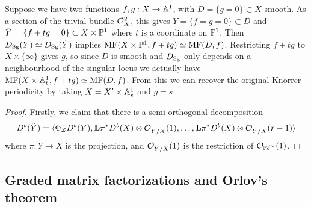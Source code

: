 \begin{example}{}{}
    Suppose we have two functions $f,g:X\to\A^1$, with $D=\{g=0\}\subset X$
    smooth. As a section of the trivial bundle $\O_X^2$, this gives
    $Y=\{f=g=0\}\subset D$ and $\tilde Y=\{f+tg=0\}\subset X\times\P^1$
    where $t$ is a coordinate on $\P^1$. Then $D_\Sg(Y)\simeq D_\Sg(\tilde Y)$
    implies $\MF(X\times\P^1,f+tg)\simeq\MF(D,f)$. Restricting $f+tg$ to
    $X\times\{\infty\}$ gives $g$, so since $D$ is smooth and $D_\Sg$ only
    depends on a neighbourhood of the singular locus we actually have
    $\MF(X\times\A^1_t,f+tg)\simeq\MF(D,f)$. From this we can recover the
    original Kn\"orrer periodicity by taking $X=X'\times\A^1_s$ and $g=s$.
\end{example}

\begin{proof}
    Firstly, we claim that there is a semi-orthogonal decomposition
    \begin{equation*}
        D^b(\tilde Y)
            = \langle\Phi_ZD^b(Y),
                \dL\pi^*D^b(X)\otimes\O_{\tilde Y/X}(1),\ldots,
                \dL\pi^*D^b(X)\otimes\O_{\tilde Y/X}(r-1)\rangle
    \end{equation*}
    where $\pi:\tilde Y\to X$ is the projection, and $\O_{\tilde Y/X}(1)$ is the
    restriction of $\O_{\P\calE^\vee}(1)$.

\end{proof}


\subsection{Graded matrix factorizations and Orlov's theorem}\label{subsec:GMF}

